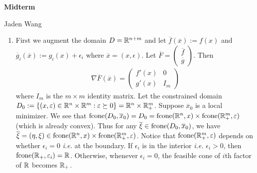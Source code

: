 \documentclass[12pt]{article}
\begin{document}
\centerline {\textsf{\textbf{\LARGE{Midterm}}}}
\centerline {Jaden Wang}
\vspace{.15in}

\begin{problem}[1]
\begin{enumerate}[label=(\alph*)]
	\item 
First we augment the domain $ D = \mathbb{R}^{n+m}$ and let $ \overline{f}(\overline{x}) := f(x)$ and $ \overline{g}_i(\overline{x}) := g_i(x)+ \epsilon_i$ where $ \overline{x} = (x, \epsilon)$. Let $ \overline{F} = \begin{pmatrix} \overline{f}\\\overline{g} \end{pmatrix} $. Then
\begin{align*}
	\nabla \overline{F}(\overline{x}) = \begin{pmatrix} f'(x)& 0\\g'(x) & I_m \end{pmatrix} 
\end{align*}
where $ I_m$ is the $ m\times m$ identity matrix. Let the constrained domain $ D_0:= \{(x, \varepsilon) \in \mathbb{R}^{n} \times \mathbb{R}^{m}: \varepsilon \succeq 0\} = \mathbb{R}^{n} \times \mathbb{R}_+^{m}$. Suppose $ \overline{x}_0$ is a local minimizer. We see that $ \operatorname{fcone}(D_0,\overline{x}_0) = D_0 = \operatorname{fcone}(\mathbb{R}^{n},x) \times \operatorname{fcone}(\mathbb{R}_+^{m}, \varepsilon)$ (which is already convex). Thus for any $ \overline{\xi} \in \operatorname{fcone}(D_0, \overline{x}_0)$, we have $ \overline{\xi} = (\eta, \xi) \in \operatorname{fcone}(\mathbb{R}^{n},x) \times \operatorname{fcone}(\mathbb{R}_+^{m}, \varepsilon)$. Notice that $ \operatorname{fcone}( \mathbb{R}_+^{m}, \varepsilon) $ depends on whether $ \epsilon_i=0$ \emph{i.e.} at the boundary. If $ \epsilon_i$ is in the interior \emph{i.e.} $ \epsilon_i > 0$, then $ \operatorname{fcone}( \mathbb{R}_+, \varepsilon_i)  = \mathbb{R}$. Otherwise, whenever $ \epsilon_i=0$, the feasible cone of $ i$th factor of $ \mathbb{R}$ becomes $ \mathbb{R}_+$.


\end{enumerate}
\end{problem}
\end{document}
